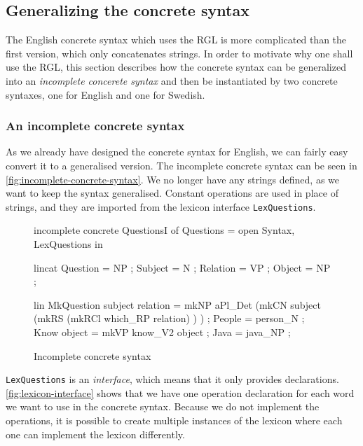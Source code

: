 \subsection{Generalizing the concrete syntax}

The English concrete syntax which uses the RGL is more complicated than the first version, which only concatenates strings. In order to motivate why one shall use the RGL, this section describes how the concrete syntax can be generalized into an \emph{incomplete concerete syntax} and then be instantiated by two concrete syntaxes, one for English and one for Swedish.

\subsubsection*{An incomplete concrete syntax}

As we already have designed the concrete syntax for English, we can fairly easy convert it to a generalised version. The incomplete concrete syntax can be seen in \autoref{fig:incomplete-concrete-syntax}. We no longer have any strings defined, as we want to keep the syntax generalised. Constant operations are used in place of strings, and they are imported from the lexicon interface  \texttt{LexQuestions}.

\begin{figure}[h]
\begin{code}
incomplete concrete QuestionsI of Questions = open Syntax, LexQuestions in {
    lincat
      Question = NP ;
      Subject = N ;
      Relation = VP ;
      Object = NP ;

    lin
      MkQuestion subject relation = mkNP aPl_Det 
                                        (mkCN subject 
                                            (mkRS 
                                                (mkRCl which_RP relation)
                                            )
                                        ) ;
      People = person_N ;
      Know object = mkVP know_V2 object ;
      Java = java_NP ;
}
\end{code}
\caption{Incomplete concrete syntax\label{fig:incomplete-concrete-syntax}}
\end{figure}

\texttt{LexQuestions} is an \emph{interface}, which means that it only provides declarations. \autoref{fig:lexicon-interface} shows that we have one operation declaration for each word we want to use in the concrete syntax. Because we do not implement the operations, it is possible to create multiple instances of the lexicon where each one can implement the lexicon differently.

